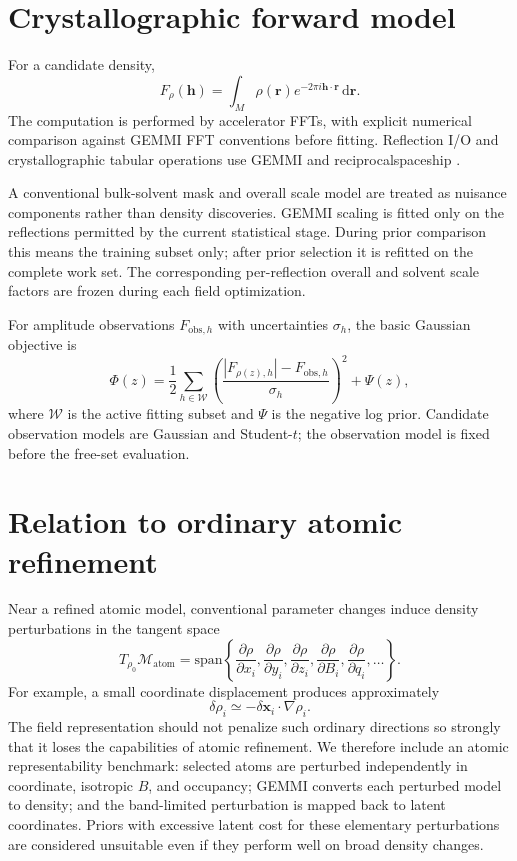 \documentclass[11pt]{article}
\newcommand{\rhozero}{\ensuremath{\rho_0}}
\newcommand{\dd}{\mathrm{d}}
\begin{document}
\section{Crystallographic forward model}
\label{sec:forward}
For a candidate density,
\begin{equation}
  F_{\rho}(\mathbf h)
  =\int_M \rho(\mathbf r)e^{-2\pi i\mathbf h\cdot\mathbf r}\,\dd\mathbf r.
\end{equation}
The computation is performed by accelerator FFTs, with explicit numerical comparison against GEMMI FFT conventions before fitting. Reflection I/O and crystallographic tabular operations use GEMMI and reciprocalspaceship \cite{greisman2021}.

A conventional bulk-solvent mask and overall scale model are treated as nuisance components rather than density discoveries. GEMMI scaling is fitted only on the reflections permitted by the current statistical stage. During prior comparison this means the training subset only; after prior selection it is refitted on the complete work set. The corresponding per-reflection overall and solvent scale factors are frozen during each field optimization.

For amplitude observations $F_{\mathrm{obs},h}$ with uncertainties $\sigma_h$, the basic Gaussian objective is
\begin{equation}
  \Phi(z)
  =\frac12\sum_{h\in\mathcal W}
   \left(
   \frac{|F_{\rho(z),h}|-F_{\mathrm{obs},h}}{\sigma_h}
   \right)^2
   +\Psi(z),
\end{equation}
where $\mathcal W$ is the active fitting subset and $\Psi$ is the negative log prior. Candidate observation models are Gaussian and Student-$t$; the observation model is fixed before the free-set evaluation.

\section{Relation to ordinary atomic refinement}
Near a refined atomic model, conventional parameter changes induce density perturbations in the tangent space
\begin{equation}
  T_{\rhozero}\mathcal M_{\mathrm{atom}}
  =\mathrm{span}\left\{
  \frac{\partial\rho}{\partial x_i},
  \frac{\partial\rho}{\partial y_i},
  \frac{\partial\rho}{\partial z_i},
  \frac{\partial\rho}{\partial B_i},
  \frac{\partial\rho}{\partial q_i},\ldots
  \right\}.
\end{equation}
For example, a small coordinate displacement produces approximately
\begin{equation}
  \delta\rho_i\simeq-\delta\mathbf x_i\cdot\nabla\rho_i.
\end{equation}
The field representation should not penalize such ordinary directions so strongly that it loses the capabilities of atomic refinement. We therefore include an atomic representability benchmark: selected atoms are perturbed independently in coordinate, isotropic $B$, and occupancy; GEMMI converts each perturbed model to density; and the band-limited perturbation is mapped back to latent coordinates. Priors with excessive latent cost for these elementary perturbations are considered unsuitable even if they perform well on broad density changes.
\end{document}
